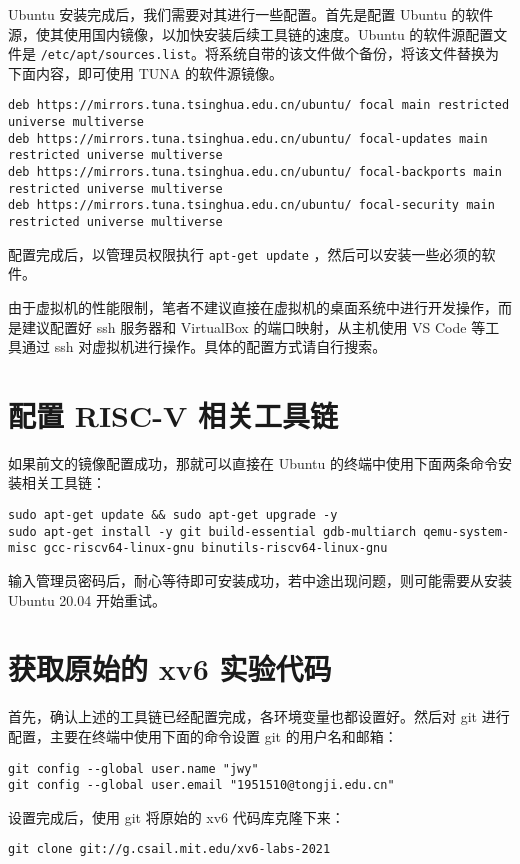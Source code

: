 Ubuntu 安装完成后，我们需要对其进行一些配置。首先是配置 Ubuntu 的软件源，使其使用国内镜像，以加快安装后续工具链的速度。Ubuntu 的软件源配置文件是 \lstinline{/etc/apt/sources.list}。将系统自带的该文件做个备份，将该文件替换为下面内容，即可使用 TUNA 的软件源镜像。
\begin{lstlisting}
deb https://mirrors.tuna.tsinghua.edu.cn/ubuntu/ focal main restricted universe multiverse
deb https://mirrors.tuna.tsinghua.edu.cn/ubuntu/ focal-updates main restricted universe multiverse
deb https://mirrors.tuna.tsinghua.edu.cn/ubuntu/ focal-backports main restricted universe multiverse
deb https://mirrors.tuna.tsinghua.edu.cn/ubuntu/ focal-security main restricted universe multiverse
\end{lstlisting}

配置完成后，以管理员权限执行 \lstinline{apt-get update} ，然后可以安装一些必须的软件。

\begin{proposition}[推荐的操作方式]
    由于虚拟机的性能限制，笔者不建议直接在虚拟机的桌面系统中进行开发操作，而是建议配置好 ssh 服务器和 VirtualBox 的端口映射，从主机使用 VS Code 等工具通过 ssh 对虚拟机进行操作。具体的配置方式请自行搜索。
\end{proposition}

\section{配置 RISC-V 相关工具链}

如果前文的镜像配置成功，那就可以直接在 Ubuntu 的终端中使用下面两条命令安装相关工具链：
\begin{lstlisting}
sudo apt-get update && sudo apt-get upgrade -y
sudo apt-get install -y git build-essential gdb-multiarch qemu-system-misc gcc-riscv64-linux-gnu binutils-riscv64-linux-gnu
\end{lstlisting}

输入管理员密码后，耐心等待即可安装成功，若中途出现问题，则可能需要从安装 Ubuntu 20.04 开始重试。

\section{获取原始的 xv6 实验代码}

首先，确认上述的工具链已经配置完成，各环境变量也都设置好。然后对 git 进行配置，主要在终端中使用下面的命令设置 git 的用户名和邮箱：
\begin{lstlisting}
git config --global user.name "jwy"
git config --global user.email "1951510@tongji.edu.cn"
\end{lstlisting}

设置完成后，使用 git 将原始的 xv6 代码库克隆下来：
\begin{lstlisting}
git clone git://g.csail.mit.edu/xv6-labs-2021
\end{lstlisting}